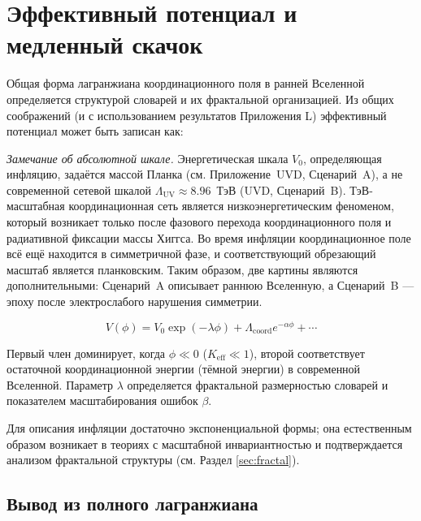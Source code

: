 \documentclass[12pt,a4paper]{article}
\theoremstyle{remark}
\newcommand{\Keff}{K_{\mathrm{eff}}}
\begin{document}
	\section{Эффективный потенциал и медленный скачок}
	\label{sec:potential}
	
	Общая форма лагранжиана координационного поля в ранней Вселенной определяется структурой словарей и их фрактальной организацией. Из общих соображений (и с использованием результатов Приложения L) эффективный потенциал может быть записан как:
	
	\noindent\textit{Замечание об абсолютной шкале.}
	Энергетическая шкала $V_0$, определяющая инфляцию, задаётся массой Планка (см. Приложение~UVD, Сценарий~A), а не современной сетевой шкалой $\Lambda_{\mathrm{UV}} \approx 8.96$~ТэВ (UVD, Сценарий~B). ТэВ-масштабная координационная сеть является низкоэнергетическим феноменом, который возникает только после фазового перехода координационного поля и радиативной фиксации массы Хиггса. Во время инфляции координационное поле всё ещё находится в симметричной фазе, и соответствующий обрезающий масштаб является планковским. Таким образом, две картины являются дополнительными: Сценарий~A описывает раннюю Вселенную, а Сценарий~B — эпоху после электрослабого нарушения симметрии.
	
	\begin{equation}
		V(\phi) = V_0 \exp\left( -\lambda \phi \right) + \Lambda_{\mathrm{coord}} e^{-\alpha \phi} + \cdots
		\label{eq:potential}
	\end{equation}
	
	Первый член доминирует, когда $\phi \ll 0$ ($\Keff \ll 1$), второй соответствует остаточной координационной энергии (тёмной энергии) в современной Вселенной. Параметр $\lambda$ определяется фрактальной размерностью словарей и показателем масштабирования ошибок $\beta$.
	
	Для описания инфляции достаточно экспоненциальной формы; она естественным образом возникает в теориях с масштабной инвариантностью и подтверждается анализом фрактальной структуры (см. Раздел \ref{sec:fractal}).
	
	\subsection{Вывод из полного лагранжиана}
	
\end{document}
